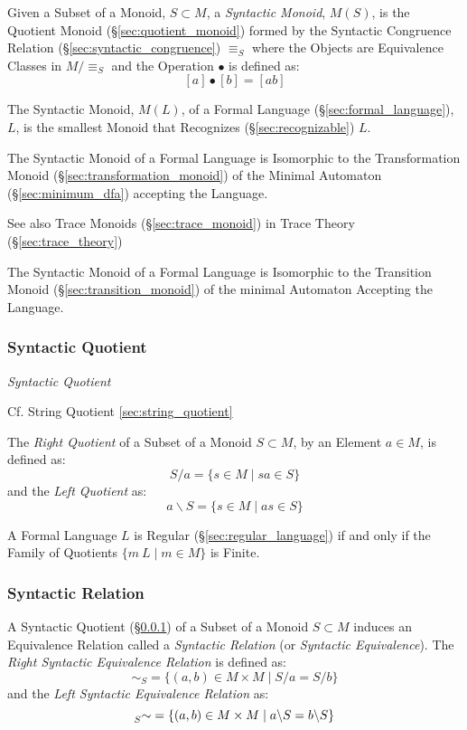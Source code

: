 Given a Subset of a Monoid, $S \subset M$, a \emph{Syntactic Monoid},
$M(S)$, is the Quotient Monoid (\S\ref{sec:quotient_monoid}) formed by
the Syntactic Congruence Relation (\S\ref{sec:syntactic_congruence})
$\equiv_S$ where the Objects are Equivalence Classes in $M / \equiv_S$
and the Operation $\bullet$ is defined as:
\[
  [a] \bullet [b] = [ab]
\]

The Syntactic Monoid, $M(L)$, of a Formal Language
(\S\ref{sec:formal_language}), $L$, is the smallest Monoid that
Recognizes (\S\ref{sec:recognizable}) $L$.

The Syntactic Monoid of a Formal Language is Isomorphic to the
Transformation Monoid (\S\ref{sec:transformation_monoid}) of the
Minimal Automaton (\S\ref{sec:minimum_dfa}) accepting the Language.

\fist See also Trace Monoids (\S\ref{sec:trace_monoid}) in Trace
Theory (\S\ref{sec:trace_theory})

The Syntactic Monoid of a Formal Language is Isomorphic to the
Transition Monoid (\S\ref{sec:transition_monoid}) of the minimal
Automaton Accepting the Language.



\subsubsection{Syntactic Quotient}\label{sec:syntactic_quotient}

\emph{Syntactic Quotient}

\fist Cf. String Quotient \ref{sec:string_quotient}

The \emph{Right Quotient} of a Subset of a Monoid $S \subset M$, by an
Element $a \in M$, is defined as:
\[
  S / a = \{ s \in M\;|\;sa \in S \}
\]
and the \emph{Left Quotient} as:
\[
  a \backslash S = \{ s \in M\;|\;as \in S \}
\]

A Formal Language $L$ is Regular (\S\ref{sec:regular_language}) if and
only if the Family of Quotients $\{ m \ L \;|\; m \in M \}$ is Finite.



\subsubsection{Syntactic Relation}\label{sec:syntactic_relation}

A Syntactic Quotient (\S\ref{sec:syntactic_quotient}) of a Subset of a
Monoid $S \subset M$ induces an Equivalence Relation called a
\emph{Syntactic Relation} (or \emph{Syntactic Equivalence}). The
\emph{Right Syntactic Equivalence Relation} is defined as:
\[
  \sim_S = \{ (a,b) \in M \times M \;|\; S/a = S/b\}
\]
and the \emph{Left Syntactic Equivalence Relation} as:
\[
  \prescript{}{S}{\sim} = \{ (a,b) \in M \times M \;|\;
  a \backslash S = b \backslash S \}
\]



